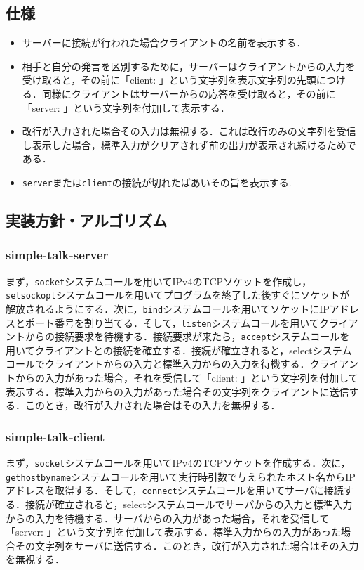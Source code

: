 \documentclass[a4paper,titlepage]{ltjsarticle}
\begin{document}
\subsection{仕様}
\begin{itemize}
    \item サーバーに接続が行われた場合クライアントの名前を表示する．
    \item 相手と自分の発言を区別するために，サーバーはクライアントからの入力を受け取ると，その前に「client: 」という文字列を表示文字列の先頭につける．同様にクライアントはサーバーからの応答を受け取ると，その前に「server: 」という文字列を付加して表示する．
    \item 改行が入力された場合その入力は無視する．これは改行のみの文字列を受信し表示した場合，標準入力がクリアされず前の出力が表示され続けるためである．
    \item \texttt{server}または\texttt{client}の接続が切れたばあいその旨を表示する.
\end{itemize}

\subsection{実装方針・アルゴリズム}
\subsubsection{simple-talk-server}
まず，\texttt{socket}システムコールを用いてIPv4のTCPソケットを作成し，\texttt{setsockopt}システムコールを用いてプログラムを終了した後すぐにソケットが解放されるようにする．次に，\texttt{bind}システムコールを用いてソケットにIPアドレスとポート番号を割り当てる．そして，\texttt{listen}システムコールを用いてクライアントからの接続要求を待機する．接続要求が来たら，\texttt{accept}システムコールを用いてクライアントとの接続を確立する．接続が確立されると，selectシステムコールでクライアントからの入力と標準入力からの入力を待機する．クライアントからの入力があった場合，それを受信して「client: 」という文字列を付加して表示する．標準入力からの入力があった場合その文字列をクライアントに送信する．このとき，改行が入力された場合はその入力を無視する．
\subsubsection{simple-talk-client}
まず，\texttt{socket}システムコールを用いてIPv4のTCPソケットを作成する．次に，\texttt{gethostbyname}システムコールを用いて実行時引数で与えられたホスト名からIPアドレスを取得する．そして，\texttt{connect}システムコールを用いてサーバに接続する．接続が確立されると，selectシステムコールでサーバからの入力と標準入力からの入力を待機する．サーバからの入力があった場合，それを受信して「server: 」という文字列を付加して表示する．標準入力からの入力があった場合その文字列をサーバに送信する．このとき，改行が入力された場合はその入力を無視する．
\end{document}
